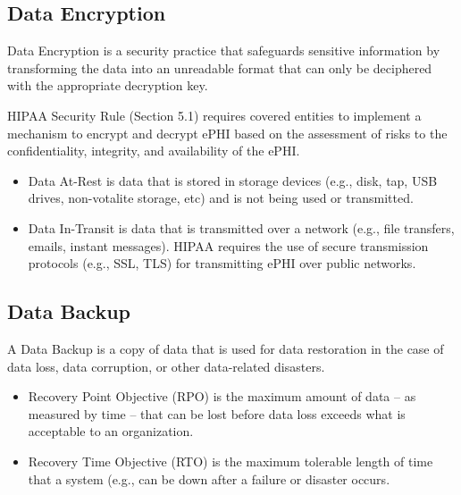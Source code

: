 \subsection{Data Encryption}

Data Encryption is a security practice that safeguards sensitive information by transforming the data into an unreadable format that can only be deciphered with the appropriate decryption key. 

HIPAA Security Rule (Section 5.1) requires covered entities to implement a mechanism to encrypt and decrypt ePHI based on the assessment of risks to the confidentiality, integrity, and availability of the ePHI. 

\begin{itemize}
    \item Data At-Rest is data that is stored in storage devices (e.g., disk, tap, USB drives, non-votalite storage, etc) and is not being used or transmitted.
    \item Data In-Transit is data that is transmitted over a network (e.g., file transfers, emails, instant messages). HIPAA requires the use of secure transmission protocols (e.g., SSL, TLS) for transmitting ePHI over public networks. 
\end{itemize}

\subsection{Data Backup}

A Data Backup is a copy of data that is used for data restoration in the case of data loss, data corruption, or other data-related disasters.

\begin{itemize}
    \item Recovery Point Objective (RPO) is the maximum amount of data – as measured by time – that can be lost before data loss exceeds what is acceptable to an organization.
    \item Recovery Time Objective (RTO) is the maximum tolerable length of time that a system (e.g., can be down after a failure or disaster occurs. 
\end{itemize}